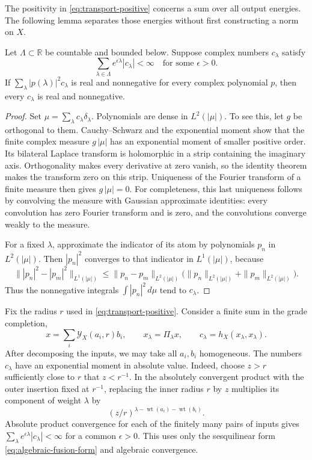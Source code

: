 The positivity in \eqref{eq:transport-positive} concerns a sum over
all output energies.  The following lemma separates those energies
without first constructing a norm on $X$.

\begin{lemma}
\label{lem:positive-moments}
Let $\Lambda\subset\mathbb R$ be countable and bounded below.
Suppose complex numbers $c_\lambda$ satisfy
\[
 \sum_{\lambda\in\Lambda}e^{\epsilon\lambda}|c_\lambda|<\infty
 \quad\text{for some }\epsilon>0.
\]
If $\sum_\lambda |p(\lambda)|^2c_\lambda$ is real and nonnegative
for every complex polynomial $p$, then every $c_\lambda$ is real
and nonnegative.
\end{lemma}

\begin{proof}
Set $\mu=\sum_\lambda c_\lambda\delta_\lambda$.  Polynomials are
dense in $L^2(|\mu|)$.  To see this, let $g$ be orthogonal to them.
Cauchy--Schwarz and the exponential moment show that the finite
complex measure $g\,|\mu|$ has an exponential moment of smaller
positive order.  Its bilateral Laplace transform is holomorphic in
a strip containing the imaginary axis.  Orthogonality makes every
derivative at zero vanish, so the identity theorem makes the
transform zero on this strip.  Uniqueness of the Fourier transform
of a finite measure then gives $g\,|\mu|=0$.  For completeness, this
last uniqueness follows by convolving the measure with Gaussian
approximate identities: every convolution has zero Fourier
transform and is zero, and the convolutions converge weakly to the
measure.

For a fixed $\lambda$, approximate the indicator of its atom by
polynomials $p_n$ in $L^2(|\mu|)$.  Then
$|p_n|^2$ converges to that indicator in $L^1(|\mu|)$, because
\[
 \big\||p_n|^2-|p_m|^2\big\|_{L^1(|\mu|)}
 \leq\|p_n-p_m\|_{L^2(|\mu|)}
       \big(\|p_n\|_{L^2(|\mu|)}+\|p_m\|_{L^2(|\mu|)}\big).
\]
Thus the nonnegative integrals $\int |p_n|^2\,d\mu$ tend to
$c_\lambda$.
\end{proof}

Fix the radius $r$ used in \eqref{eq:transport-positive}.  Consider
a finite sum in the grade completion,
\[
 x=\sum_i\mathcal Y_X(a_i,r)b_i,
 \qquad x_\lambda=\Pi_\lambda x,
 \qquad c_\lambda=h_X(x_\lambda,x_\lambda).
\]
After decomposing the inputs, we may take all $a_i,b_i$
homogeneous.  The numbers $c_\lambda$ have an exponential moment
in absolute value.  Indeed, choose $z>r$ sufficiently close to $r$
that $z<r^{-1}$.  In the absolutely convergent product with the
outer insertion fixed at $r^{-1}$, replacing the inner radius $r$
by $z$ multiplies its component of weight $\lambda$ by
\[
 (z/r)^{\lambda-\operatorname{wt}(a_i)-\operatorname{wt}(b_i)}.
\]
Absolute product convergence for each of the finitely many pairs
of inputs gives
$\sum_\lambda e^{\epsilon\lambda}|c_\lambda|<\infty$ for a
common $\epsilon>0$.  This uses only the sesquilinear form
\eqref{eq:algebraic-fusion-form} and algebraic convergence.

